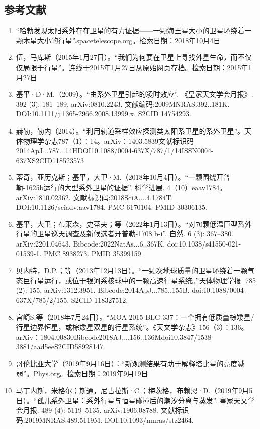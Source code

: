 \subsection{参考文献}
\begin{enumerate}
\item “哈勃发现太阳系外存在卫星的有力证据——一颗海王星大小的卫星环绕着一颗木星大小的行星”.spacetelescope.org。检索日期：2018年10月4日
\item 伍，马库斯（2015年1月27日）。“我们为何要在卫星上寻找外星生命，而不仅仅局限于行星”。连线于2015年1月27日从原始网页存档。检索日期：2015年1月27日
\item 基平·D·M.（2009）。“由系外卫星引起的凌时效应”. 《皇家天文学会月报》. 392 (3): 181–189. arXiv:0810.2243. 文献编码:2009MNRAS.392..181K. DOI:10.1111/j.1365-2966.2008.13999.x. S2CID 14754293.
\item 赫勒，勒内（2014）。“利用轨道采样效应探测类太阳系卫星的系外卫星”。天体物理学杂志787（1）：14。arXiv：1403.5839文献标识码2014ApJ...787...14HDOI10.1088/0004-637X/787/1/14ISSN0004-637XS2CID118523573
\item 蒂奇，亚历克斯；基平，大卫·M.（2018年10月4日）。“一颗围绕开普勒-1625b运行的大型系外卫星的证据”. 科学进展. 4（10）eaav1784。arXiv:1810.02362. 文献标识码:2018SciA....4.1784T. DOI:10.1126/sciadv.aav1784. PMC 6170104. PMID 30306135.
\item 基平，大卫；布莱森，史蒂夫；等（2022年1月13日）。“对70颗低温巨型系外行星的卫星巡天调查及新候选者开普勒-1708 b-i”. 自然. 6 (3): 367–380. arXiv:2201.04643. Bibcode:2022NatAs...6..367K. doi:10.1038/s41550-021-01539-1. PMC 8938273. PMID 35399159.
\item 贝内特，D.P.；等（2013年12月13日）。“一颗次地球质量的卫星环绕着一颗气态巨行星运行，或位于银河系核球中的一颗高速行星系统。”天体物理学报. 785 (2): 155. arXiv:1312.3951. Bibcode:2014ApJ...785..155B. doi:10.1088/0004-637X/785/2/155. S2CID 118327512.
\item 宫崎S.等（2018年7月24日）。“MOA-2015-BLG-337：一个拥有低质量棕矮星/行星边界恒星，或棕矮星双星的行星系统”。《天文学杂志》156（3）：136。arXiv：1804.00830Bibcode2018AJ....156..136Mdoi10.3847/1538-3881/aad5eeS2CID58928147
\item 哥伦比亚大学（2019年9月16日）：“新观测结果有助于解释塔比星的亮度减弱”。Phys.org。检索日期：2019年9月19日
\item 马丁内斯，米格尔；斯通，尼古拉斯·C.；梅茨格，布赖恩·D.（2019年9月5日）。“孤儿系外卫星：系外行星与恒星碰撞后的潮汐分离与蒸发”. 皇家天文学会月报. 489 (4): 5119–5135. arXiv:1906.08788. 文献标识码:2019MNRAS.489.5119M. DOI:10.1093/mnras/stz2464.

\end{enumerate}

